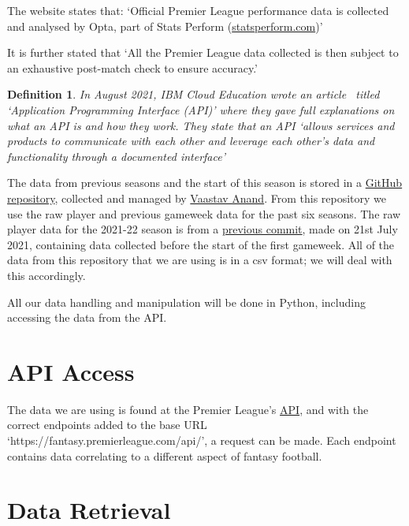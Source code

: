 \documentclass[12pt, a4paper, oneside]{book}
\newtheorem{definition}[theorem]{Definition}
\numberwithin{equation}{section}
\begin{document}
The website states that: `Official Premier League performance data is collected and
analysed by Opta, part of Stats Perform (\href{https://www.statsperform.com/}{statsperform.com})'

It is further stated that `All the Premier League data collected is then subject to an
exhaustive post-match check to ensure accuracy.'

\begin{definition}\label{API definition}
  In August 2021, IBM Cloud Education wrote an article~\cite{API Definition} titled `Application
  Programming Interface (API)' where they gave full explanations on what an API is and how they
  work. They state that an API `allows services and products to communicate with each other and
  leverage each other’s data and functionality through a documented interface'
\end{definition}

The data from previous seasons and the start of this season is stored in a \href{https://github.com/vaastav/Fantasy-Premier-League}{GitHub repository}, collected and managed by \href{https://github.com/vaastav}{Vaastav Anand}. From this repository we use the raw player and previous gameweek data for the past six seasons. The raw player data for the 2021-22 season is from a \href{https://github.com/vaastav/Fantasy-Premier-League/commit/0601bb2992bd202000461c7df7f56fc2d2e3d5a1}{previous commit}, made on 21st July 2021, containing data collected before the start of the first gameweek. All of the data from this repository that we are using is in a csv format; we will deal with this accordingly.

All our data handling and manipulation will be done in Python, including accessing the data from the API.

\section{API Access}\label{sec:3.1}

The data we are using is found at the Premier League's \hyperref[API definition]{API}, and with the correct endpoints
added to the base URL `https://fantasy.premierleague.com/api/', a request can be made.
Each endpoint contains data correlating to a different aspect of fantasy football.

\section{Data Retrieval}\label{sec:3.2}
\end{document}
